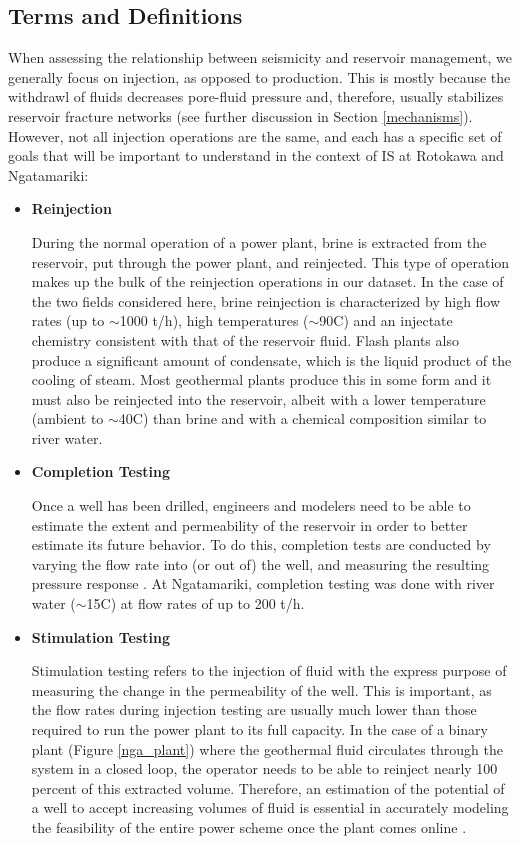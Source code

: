 \subsection{Terms and Definitions}\label{terms}

When assessing the relationship between seismicity and reservoir management, we generally focus on injection, as opposed to production. This is mostly because the withdrawl of fluids decreases pore-fluid pressure and, therefore, usually stabilizes reservoir fracture networks \citep{Segall_1994,Segall_1998}(see further discussion in Section \ref{mechanisms}). However, not all injection operations are the same, and each has a specific set of goals that will be important to understand in the context of IS at Rotokawa and Ngatamariki:
\begin{itemize}
  \item{\textbf{Reinjection}}
  
  During the normal operation of a power plant, brine is extracted from the reservoir, put through the power plant, and reinjected. This type of operation makes up the bulk of the reinjection operations in our dataset. In the case of the two fields considered here, brine reinjection is characterized by high flow rates (up to $\sim$1000 t/h), high temperatures ($\sim$90\textdegree C) and an injectate chemistry consistent with that of the reservoir fluid. Flash plants also produce a significant amount of condensate, which is the liquid product of the cooling of steam. Most geothermal plants produce this in some form and it must also be reinjected into the reservoir, albeit with a lower temperature (ambient to $\sim$40\textdegree{}C) than brine and with a chemical composition similar to river water.
  \item{\textbf{Completion Testing}}
  
  Once a well has been drilled, engineers and modelers need to be able to estimate the extent and \gls{permeability} of the reservoir in order to better estimate its future behavior. To do this, completion tests are conducted by varying the flow rate into (or out of) the well, and measuring the resulting pressure response \citep{horne1995modern}. At Ngatamariki, completion testing was done with river water ($\sim$15\textdegree C) at flow rates of up to 200 t/h.
  \item{\textbf{Stimulation Testing}}
  
  Stimulation testing refers to the injection of fluid with the express purpose of measuring the change in the \gls{permeability} of the well. This is important, as the flow rates during injection testing are usually much lower than those required to run the power plant to its full capacity. In the case of a binary plant (Figure \ref{nga_plant}) where the geothermal fluid circulates through the system in a closed loop, the operator needs to be able to reinject nearly 100 percent of this extracted volume. Therefore, an estimation of the potential of a well to accept increasing volumes of fluid is essential in accurately modeling the feasibility of the entire power scheme once the plant comes online \citep{DiPippo_2016,Grant_2011}.
  

\end{itemize}
